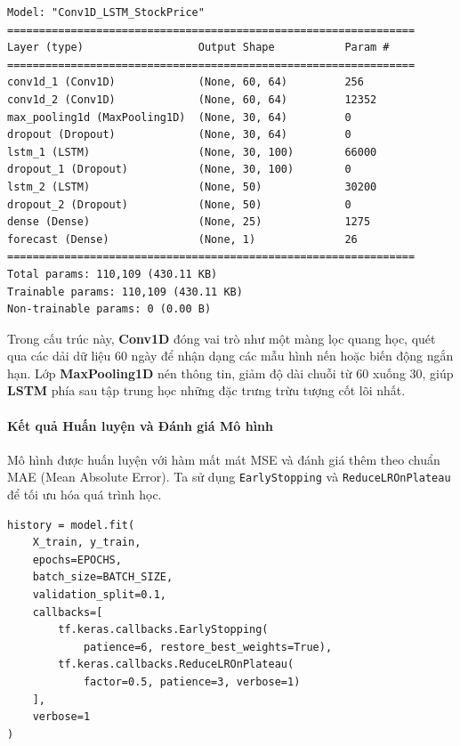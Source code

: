 \begin{lstlisting}[style=consoleoutput, caption={Output: Cấu trúc tham số mạng Hybrid}]
Model: "Conv1D_LSTM_StockPrice"
================================================================
Layer (type)                  Output Shape           Param #
================================================================
conv1d_1 (Conv1D)             (None, 60, 64)         256
conv1d_2 (Conv1D)             (None, 60, 64)         12352
max_pooling1d (MaxPooling1D)  (None, 30, 64)         0
dropout (Dropout)             (None, 30, 64)         0
lstm_1 (LSTM)                 (None, 30, 100)        66000
dropout_1 (Dropout)           (None, 30, 100)        0
lstm_2 (LSTM)                 (None, 50)             30200
dropout_2 (Dropout)           (None, 50)             0
dense (Dense)                 (None, 25)             1275
forecast (Dense)              (None, 1)              26
================================================================
Total params: 110,109 (430.11 KB)
Trainable params: 110,109 (430.11 KB)
Non-trainable params: 0 (0.00 B)
\end{lstlisting}

Trong cấu trúc này, \textbf{Conv1D} đóng vai trò như một màng lọc quang học, quét qua các dải dữ liệu 60 ngày để nhận dạng các mẫu hình nến hoặc biến động ngắn hạn. Lớp \textbf{MaxPooling1D} nén thông tin, giảm độ dài chuỗi từ 60 xuống 30, giúp \textbf{LSTM} phía sau tập trung học những đặc trưng trừu tượng cốt lõi nhất.

\paragraph{Kết quả Huấn luyện và Đánh giá Mô hình} \hfill\mbox{}

Mô hình được huấn luyện với hàm mất mát MSE và đánh giá thêm theo chuẩn MAE (Mean Absolute Error). Ta sử dụng \texttt{EarlyStopping} và \texttt{ReduceLROnPlateau} để tối ưu hóa quá trình học.

\begin{lstlisting}[style=pythoncode, caption={Quá trình Fit mô hình với Callback}]
history = model.fit(
    X_train, y_train,
    epochs=EPOCHS,
    batch_size=BATCH_SIZE,
    validation_split=0.1,
    callbacks=[
        tf.keras.callbacks.EarlyStopping(
            patience=6, restore_best_weights=True),
        tf.keras.callbacks.ReduceLROnPlateau(
            factor=0.5, patience=3, verbose=1)
    ],
    verbose=1
)
\end{lstlisting}

